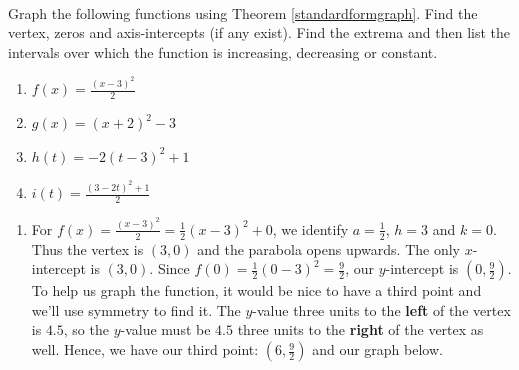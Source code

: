 \documentclass{ximera}
\begin{document}
\begin{example}\label{parabolaex1} $~$

Graph the following functions using Theorem \ref{standardformgraph}. Find the vertex, zeros and axis-intercepts (if any exist). Find the extrema and then list the intervals over which the function is increasing, decreasing or constant.


\begin{enumerate}

\item  $f(x) = \frac{(x-3)^2}{2}$ 

\item  $g(x) = (x+2)^2 - 3$ 


\item  $h(t) = -2(t-3)^2+1$ 

\item  $i(t) = \frac{(3-2t)^2 +1}{2}$ 
\end{enumerate}

\begin{explanation}
    
\begin{enumerate}

\item For $f(x) = \frac{(x-3)^2}{2}  = \frac{1}{2} (x-3)^2+0$, we identify $a = \frac{1}{2}$, $h = 3$ and $k = 0$.  Thus the vertex is $(3,0)$ and the parabola opens upwards.  The only $x$-intercept is $(3,0)$.  Since $f(0) = \frac{1}{2} (0-3)^2 = \frac{9}{2}$, our $y$-intercept is $\left(0, \frac{9}{2}\right)$.  To help us graph the function, it would be nice to have a third point and we'll use symmetry to find it.  The $y$-value three units to the \textbf{left} of the vertex is $4.5$, so the $y$-value must be $4.5$ three units to the \textbf{right} of the vertex as well.  Hence, we have our third point:  $\left(6, \frac{9}{2}\right)$ and our graph below.

\begin{center}
    \begin{image}
\end{image}
\end{center}
\end{enumerate}
\end{explanation}
\end{example}
\end{document}
